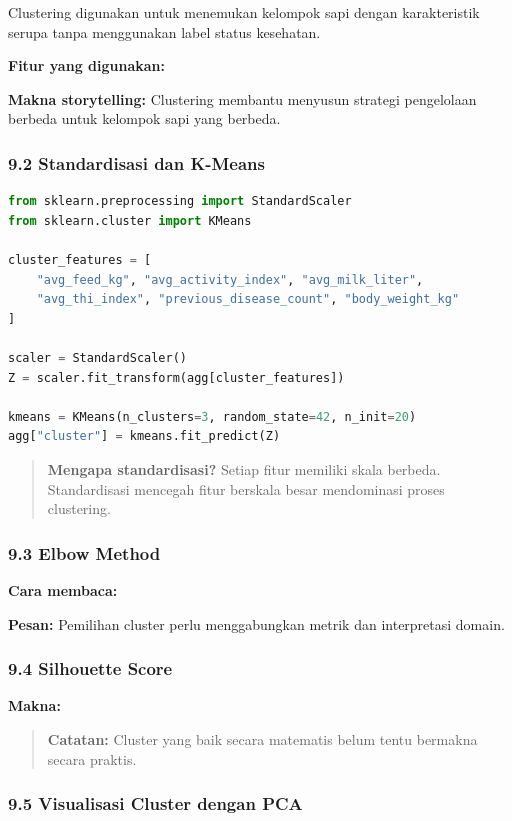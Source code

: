 \documentclass[12pt,a4paper]{article}
\begin{document}
Clustering digunakan untuk menemukan kelompok sapi dengan karakteristik serupa tanpa menggunakan label status kesehatan.


\textbf{Fitur yang digunakan:}


\textbf{Makna storytelling:} Clustering membantu menyusun strategi pengelolaan berbeda untuk kelompok sapi yang berbeda.


\subsubsection{9.2 Standardisasi dan K-Means}

\begin{lstlisting}[language=Python]
from sklearn.preprocessing import StandardScaler
from sklearn.cluster import KMeans

cluster_features = [
    "avg_feed_kg", "avg_activity_index", "avg_milk_liter",
    "avg_thi_index", "previous_disease_count", "body_weight_kg"
]

scaler = StandardScaler()
Z = scaler.fit_transform(agg[cluster_features])

kmeans = KMeans(n_clusters=3, random_state=42, n_init=20)
agg["cluster"] = kmeans.fit_predict(Z)
\end{lstlisting}

\begin{quote}
\textbf{Mengapa standardisasi?} Setiap fitur memiliki skala berbeda. Standardisasi mencegah fitur berskala besar mendominasi proses clustering.\end{quote}


\subsubsection{9.3 Elbow Method}

\textbf{Cara membaca:}


\textbf{Pesan:} Pemilihan cluster perlu menggabungkan metrik dan interpretasi domain.


\subsubsection{9.4 Silhouette Score}

\textbf{Makna:}


\begin{quote}
\textbf{Catatan:} Cluster yang baik secara matematis belum tentu bermakna secara praktis.\end{quote}


\subsubsection{9.5 Visualisasi Cluster dengan PCA}
\end{document}
